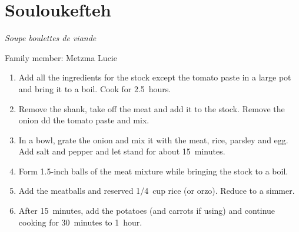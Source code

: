 \chapter{Souloukefteh}
\label{ch:souloukefteh}


\textit{Soupe boulettes de viande}

Family member: Metzma Lucie

\begin{enumerate}
    \item Add all the ingredients for the stock except the tomato paste in a large pot and bring it to a boil. Cook for 2.5~hours.
    \item Remove the shank, take off the meat and add it to the stock. Remove the onion dd the tomato paste and mix.
    \item In a bowl, grate the onion and mix it with the meat, rice, parsley and egg. Add salt and pepper and let stand for about 15~minutes.
    \item Form 1.5-inch balls of the meat mixture while bringing the stock to a boil.
    \item Add the meatballs and reserved 1/4~cup rice (or orzo). Reduce to a simmer.
    \item After 15~minutes, add the potatoes (and carrots if using) and continue cooking for 30~minutes to 1~hour.
\end{enumerate}
